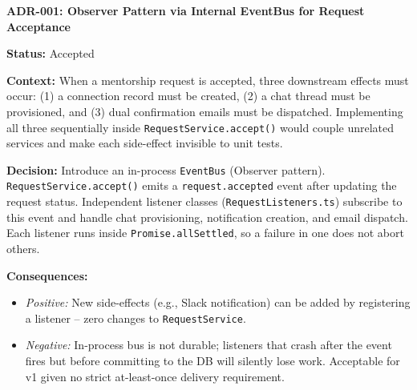 \documentclass[12pt,a4paper]{article}
\begin{document}
\begin{adrbox}
\textbf{ADR-001: Observer Pattern via Internal EventBus for Request Acceptance}

\textbf{Status:} Accepted

\textbf{Context:} When a mentorship request is accepted, three downstream effects must occur: (1) a connection record must be created, (2) a chat thread must be provisioned, and (3) dual confirmation emails must be dispatched. Implementing all three sequentially inside \texttt{RequestService.accept()} would couple unrelated services and make each side-effect invisible to unit tests.

\textbf{Decision:} Introduce an in-process \texttt{EventBus} (Observer pattern). \texttt{RequestService.accept()} emits a \texttt{request.accepted} event after updating the request status. Independent listener classes (\texttt{RequestListeners.ts}) subscribe to this event and handle chat provisioning, notification creation, and email dispatch. Each listener runs inside \texttt{Promise.allSettled}, so a failure in one does not abort others.

\textbf{Consequences:}
\begin{itemize}[leftmargin=*,topsep=2pt]
  \item \textit{Positive:} New side-effects (e.g., Slack notification) can be added by registering a listener -- zero changes to \texttt{RequestService}.
  \item \textit{Negative:} In-process bus is not durable; listeners that crash after the event fires but before committing to the DB will silently lose work. Acceptable for v1 given no strict at-least-once delivery requirement.
\end{itemize}
\end{adrbox}

\vspace{0.8em}
\end{document}

